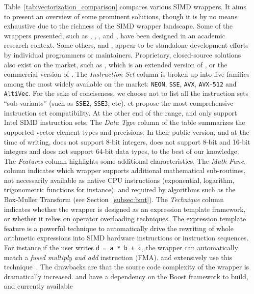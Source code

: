 Table~\ref{tab:vectorization_comparison} compares various SIMD wrappers. It aims
to present an overview of some prominent solutions, though it is by no means
exhaustive due to the richness of the SIMD wrapper landscape. Some of the
wrappers presented, such as \MIPP, \Vc, \BoostSIMD, \VCL and \TSIMD, have been
designed in an academic research context. Some others, \simdpp and \xsimd,
appear to be standalone development efforts by individual programmers or
maintainers. Proprietary, closed-source solutions also exist on the market, such
as \bSIMD, which is an extended version of \BoostSIMD, or the commercial version
of \VCL. The \textit{Instruction Set} column is broken up into five families
among the most widely available on the market: \verb|NEON|, \verb|SSE|,
\verb|AVX|, \verb|AVX-512| and \verb|AltiVec|. For the sake of conciseness, we
choose not to list all the instruction sets ``sub-variants'' (such as
\verb|SSE2|, \verb|SSE3|, etc). \simdpp et \bSIMD propose the most comprehensive
instruction set compatibility. At the other end of the range, \xsimd and
\BoostSIMD only support Intel SIMD instruction sets. The \textit{Data Type}
column of the table summarizes the supported vector element types and
precisions. In their public version, and at the time of writing, \Vc does not
support 8-bit integers, \xsimd does not support 8-bit and 16-bit integers and
\TSIMD does not support 64-bit data types, to the best of our knowledge. The
\textit{Features} column highlights some additional characteristics. The
\textit{Math Func.}~ column indicates which wrapper supports additional
mathematical sub-routines, not necessarily available as native CPU instructions
(exponential, logarithm, trigonometric functions for instance), and required by
algorithms such as the Box-Muller Transform (see Section~\ref{subsec:bmt}). The
\textit{\Cxx Technique} column indicates whether the wrapper is designed as an
expression template framework, or whether it relies on operator overloading
techniques. The expression template feature is a powerful technique to
automatically drive the rewriting of whole arithmetic expressions into SIMD
hardware instructions or instruction sequences. For instance if the user writes
\verb|d = a * b + c|, the wrapper can automatically match a \emph{fused multiply
and add} instruction (FMA). \BoostSIMD and \bSIMD extensively use this
technique~\cite{Esterie2012,Esterie2012a}. The drawbacks are that the source
code complexity of the wrapper is dramatically increased. \BoostSIMD and \bSIMD
have a dependency on the Boost framework to build, and currently available \Cxx
